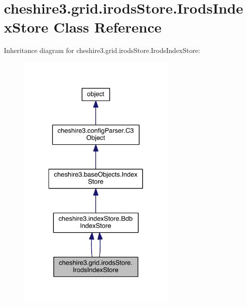 \hypertarget{classcheshire3_1_1grid_1_1irods_store_1_1_irods_index_store}{\section{cheshire3.\-grid.\-irods\-Store.\-Irods\-Index\-Store Class Reference}
\label{classcheshire3_1_1grid_1_1irods_store_1_1_irods_index_store}
}


Inheritance diagram for cheshire3.\-grid.\-irods\-Store.\-Irods\-Index\-Store\-:
\nopagebreak
\begin{figure}[H]
\begin{center}
\leavevmode
\includegraphics[width=224pt]{classcheshire3_1_1grid_1_1irods_store_1_1_irods_index_store__inherit__graph}
\end{center}
\end{figure}


